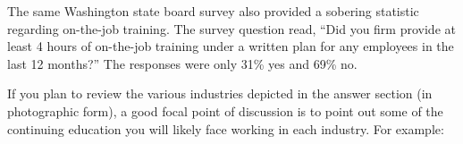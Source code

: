 





The same Washington state board survey also provided a sobering statistic regarding on-the-job training.  The survey question read, ``Did you firm provide at least 4 hours of on-the-job training under a written plan for any employees in the last 12 months?''  The responses were only 31\% yes and 69\% no.

\vskip 10pt

If you plan to review the various industries depicted in the answer section (in photographic form), a good focal point of discussion is to point out some of the continuing education you will likely face working in each industry.  For example:

